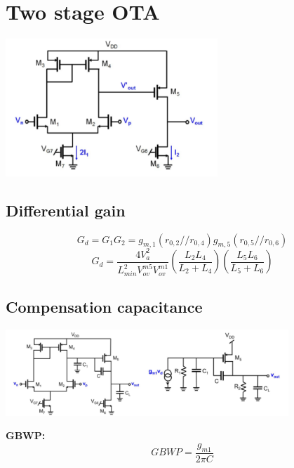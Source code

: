 \chapter{Two stage OTA}

\centering
\includegraphics[width=0.6\textwidth]{twostageota.png}\\
\raggedright

\section{Differential gain}
\begin{equation}
G_d=G_1G_2=g_{m,1}(r_{0,2}//r_{0,4})g_{m,5}(r_{0,5}//r_{0,6})
\end{equation}
\begin{equation}
G_d=\frac{4V_a^2}{L_{min}^2V_{ov}^{m5}V_{ov}^{m1}}(\frac{L_2L_4}{L_2+L_4})(\frac{L_5L_6}{L_5+L_6})
\end{equation}
\section{Compensation capacitance}

\centering
\includegraphics[width=0.8\textwidth]{compcap.png}\\
\raggedright

{\bf GBWP: }
\begin{equation}
GBWP=\frac{g_{m1}}{2\pi C}
\end{equation}

